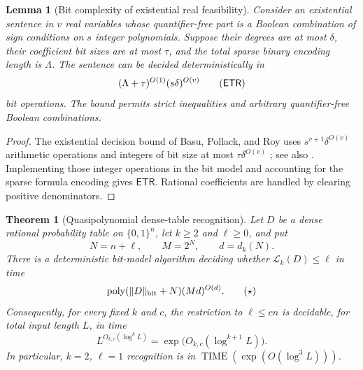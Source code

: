 \documentclass{article}
\newcommand{\LC}{\mathcal{L}}
\newcommand{\bits}{\{0,1\}}
\newtheorem{theorem}{Theorem}
\newtheorem{lemma}{Lemma}
\begin{document}
\begin{lemma}[Bit complexity of existential real feasibility]
\label{lem:etr-bit-bound}
Consider an existential sentence in $v$ real variables whose quantifier-free
part is a Boolean combination of sign conditions on $s$ integer polynomials.
Suppose their degrees are at most $\delta$, their coefficient bit sizes are at
most $\tau$, and the total sparse binary encoding length is $\Lambda$.  The
sentence can be decided deterministically in
\[
  (\Lambda+\tau)^{O(1)}(s\delta)^{O(v)}
  \tag{$\mathsf{ETR}$}
\]
bit operations.  The bound permits strict inequalities and arbitrary
quantifier-free Boolean combinations.
\end{lemma}

\begin{proof}
The existential decision bound of Basu, Pollack, and Roy uses
$s^{v+1}\delta^{O(v)}$ arithmetic operations and integers of bit size at most
$\tau\delta^{O(v)}$ \cite[Theorem~13.13, p.~516]{basu06}; see also
\cite[Theorem~1.1]{renegar92}.  Implementing those integer operations in the
bit model and accounting for the sparse formula encoding gives
$\mathsf{ETR}$.  Rational coefficients are handled by clearing positive
denominators.
\end{proof}

\begin{theorem}[Quasipolynomial dense-table recognition]
\label{thm:qp-recognition}
Let $D$ be a dense rational probability table on $\bits^n$, let $k\ge2$ and
$\ell\ge0$,
and put
\[
  N=n+\ell,\qquad M=2^N,\qquad d=d_k(N).
\]
There is a deterministic bit-model algorithm deciding whether
$\LC_k(D)\le\ell$ in time
\[
  \operatorname{poly}(\lVert D\rVert_{\rm bit}+N)(Md)^{O(d)}.
  \tag{\(\star\)}
\]
Consequently, for every fixed $k$ and $c$, the restriction to
$\ell\le cn$ is decidable, for total input length $L$, in time
\[
  L^{O_{k,c}(\log^k L)}
  =\exp\!\bigl(O_{k,c}(\log^{k+1}L)\bigr).
\]
In particular, $k=2$, $\ell=1$ recognition is in
$\operatorname{TIME}(\exp(O(\log^3L)))$.
\end{theorem}
\end{document}
